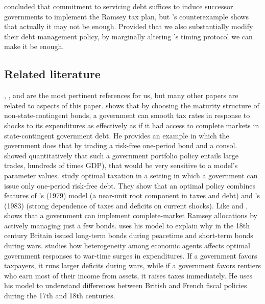 \documentclass[12pt]{article}
\newcommand{\TS}[1]{{\textcolor{magenta}{#1}}}
\begin{document}
 \citeauthor{LucasStokey1983} concluded that %
  commitment to servicing debt suffices to induce successor governments to  implement the Ramsey tax plan,  but \citeauthor{debortoli2021optimal}'s counterexample shows that actually it may not   be enough. Provided that we also substantially modify their
  debt management policy,  by marginally altering    
 \citeauthor{LucasStokey1983}'s timing protocol we can make it be enough. 


\subsection*{Related literature}


\citet{barro1979determination},  \citet{LucasStokey1983}, and \citet{debortoli2021optimal} are the most pertinent references for us, but  many other papers are related to  aspects of this paper.
\citet{angeletos2002fiscal}
 shows that by choosing the maturity structure of non-state-contingent bonds, a  government can smooth tax rates in response to  shocks to its expenditures  as effectively  as  if it had access
 to complete markets in state-contingent government debt. He provides an example in which the government does that by trading a risk-free one-period bond and a consol. 
 \citet{buera2004optimal} showed quantitatively that such a government portfolio policy   entails large trades, hundreds of times GDP), that would be very  sensitive to a model's parameter values. \citet{aiyagari2002optimal} 
study  optimal taxation in a setting in which  a government can issue only one-period risk-free debt.    They show that an  optimal policy   combines features  of \citeauthor{barro1979determination}'s (1979)  model (a near-unit root component in taxes and debt)  and  \citeauthor{LucasStokey1983}'s (1983) (strong dependence of taxes and deficits on current shocks). 
Like \citet{angeletos2002fiscal} and \citet{buera2004optimal}, 
\cite{shin2007managing} shows  that a government can implement complete-market Ramsey allocations by  actively managing  just a few bonds. %
\citeauthor{shin2007managing} uses his model to explain why  in the 18th century Britain issued long-term bonds during peacetime and short-term bonds during wars.
\citet{bassetto2014optimal} studies  how heterogeneity among economic agents affects optimal government  responses to war-time surges in expenditures. If  a government  favors  taxpayers, it  runs larger deficits during wars, while if a government favors rentiers who earn most of their income from assets, it raises taxes immediately. He uses his model to understand  differences between British and French fiscal policies during the 17th and 18th centuries.
\end{document}
